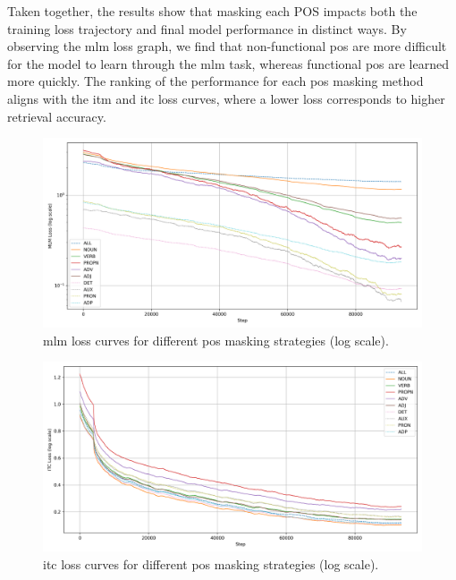 Taken together, the results show that masking each POS impacts both the training loss trajectory and final model performance in distinct ways.  
By observing the \acrshort{mlm} loss graph, we find that non-functional \acrshort{pos} are more difficult for the model to learn through the \acrshort{mlm} task, whereas functional \acrshort{pos} are learned more quickly.
The ranking of the performance for each \acrshort{pos} masking method aligns with the \acrshort{itm} and \acrshort{itc} loss curves, where a lower loss corresponds to higher retrieval accuracy.

\begin{figure}[H]
    \centering
    \includegraphics[width=\textwidth]{Images/graph/mlm.png}
    \caption{\acrshort{mlm} loss curves for different \acrshort{pos} masking strategies (log scale).}
    \label{fig:mlm_loss_pretrain}
\end{figure}

\begin{figure}[H]
    \centering
    \includegraphics[width=\textwidth]{Images/graph/itc.png}
    \caption{\acrshort{itc} loss curves for different \acrshort{pos} masking strategies (log scale).}
    \label{fig:itc_loss_pretrain}
\end{figure}

